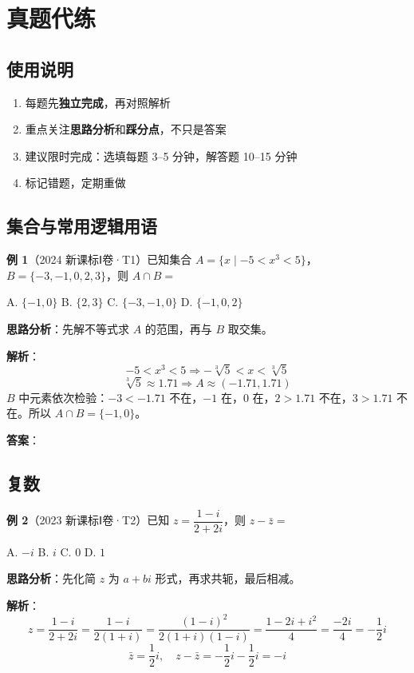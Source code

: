 \section{真题代练}

\subsection{使用说明}

\begin{enumerate}
  \item 每题先\textbf{独立完成}，再对照解析
  \item 重点关注\textbf{思路分析}和\textbf{踩分点}，不只是答案
  \item 建议限时完成：选填每题 3--5 分钟，解答题 10--15 分钟
  \item 标记错题，定期重做
\end{enumerate}

\subsection{集合与常用逻辑用语}

\textbf{例 1}（2024 新课标Ⅰ卷·T1）已知集合 $A = \{x \mid -5 < x^3 < 5\}$，$B = \{-3,-1,0,2,3\}$，则 $A \cap B =$

A. $\{-1,0\}$ \quad B. $\{2,3\}$ \quad C. $\{-3,-1,0\}$ \quad D. $\{-1,0,2\}$

\textbf{思路分析}：先解不等式求 $A$ 的范围，再与 $B$ 取交集。

\textbf{解析}：
\[
-5 < x^3 < 5 \Rightarrow -\sqrt[3]{5} < x < \sqrt[3]{5}
\]
\[
\sqrt[3]{5} \approx 1.71 \Rightarrow A \approx (-1.71, 1.71)
\]
$B$ 中元素依次检验：$-3<-1.71$ 不在，$-1$ 在，$0$ 在，$2>1.71$ 不在，$3>1.71$ 不在。所以 $A\cap B = \{-1,0\}$。

\textbf{答案}：

\subsection{复数}

\textbf{例 2}（2023 新课标Ⅰ卷·T2）已知 $z = \dfrac{1-i}{2+2i}$，则 $z - \bar{z} =$

A. $-i$ \quad B. $i$ \quad C. $0$ \quad D. $1$

\textbf{思路分析}：先化简 $z$ 为 $a+bi$ 形式，再求共轭，最后相减。

\textbf{解析}：
\[
z = \frac{1-i}{2+2i} = \frac{1-i}{2(1+i)} = \frac{(1-i)^2}{2(1+i)(1-i)} = \frac{1-2i+i^2}{4} = \frac{-2i}{4} = -\frac12 i
\]
\[
\bar{z} = \frac12 i,\quad z - \bar{z} = -\frac12 i - \frac12 i = -i
\]

